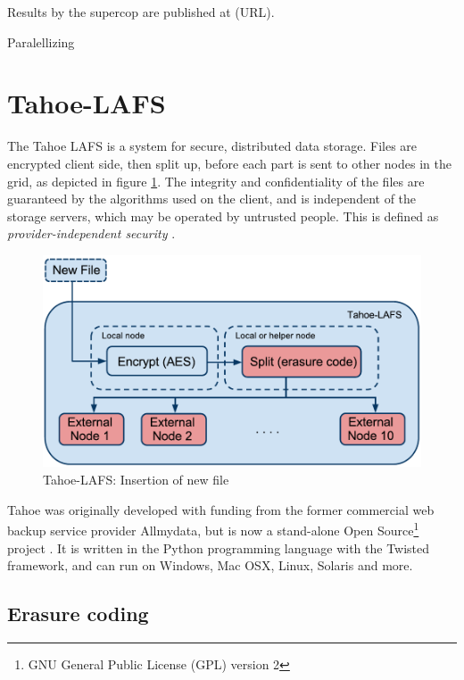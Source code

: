 \documentclass[english,12pt,a4paper]{book}
\begin{document}
Results by the supercop are published at (URL).


Paralellizing

\section{Tahoe-LAFS}

The Tahoe \ac{LAFS} is a system for secure,
distributed data storage. Files are encrypted client side, then
split up, before each part is sent to other nodes in the grid, as depicted in
figure \ref{fig:tahoeinsertion}. The integrity and confidentiality of the files
are guaranteed by the algorithms used on the client, and is independent of the
storage servers, which may be operated by untrusted people. This is defined as
\emph{provider-independent security} \cite{t_tahoe}.

\begin{figure}[h!]
    \centering
    \includegraphics[width=0.9\columnwidth]{Tahoe-newfile.pdf}
    \caption{Tahoe-LAFS: Insertion of new file}
    \label{fig:tahoeinsertion}
\end{figure}

Tahoe was originally developed with funding from the former commercial web
backup service provider Allmydata, but is now a stand-alone Open
Source\footnote{GNU General Public License (GPL) version 2} project \cite{t_ars}.
It is written in the Python programming language with the Twisted framework, and
can run on Windows, Mac OSX, Linux, Solaris and more.



\subsection{Erasure coding}
\end{document}
